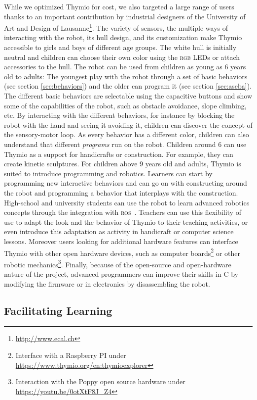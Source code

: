 \documentclass[letterpaper, 10 pt, conference]{ieeeconf}  %
\begin{document}
While we optimized Thymio for cost, we also targeted a large range of users thanks to an important contribution by industrial designers of the University of Art and Design of Lausanne\footnote{\url{http://www.ecal.ch}}.
The variety of sensors, the multiple ways of interacting with the robot, its hull design, and its customization make Thymio accessible to girls and boys of different age groups.
The white hull is initially neutral and children can choose their own color using the \textsc{rgb} LEDs or attach accessories to the hull.
The robot can be used from children as young as 6 years old to adults:
The youngest play with the robot through a set of basic behaviors (see section \ref{sec:behaviors}) and the older can program it (see section \ref{sec:aseba}).
The different basic behaviors are selectable using the capacitive buttons and show some of the capabilities of the robot, such as obstacle avoidance, slope climbing, etc.
By interacting with the different behaviors, for instance by blocking the robot with the hand and seeing it avoiding it, children can discover the concept of the sensory-motor loop. 
As every behavior has a different color, children can also understand that different \emph{programs} run on the robot.
Children around 6 can use Thymio as a support for handicrafts or construction.
For example, they can create kinetic sculptures.
For children above 9 years old and adults, Thymio is suited to introduce programming and robotics.
Learners can start by programming new interactive behaviors and can go on with constructing around the robot and programming a behavior that interplays with the construction.
High-school and university students can use the robot to learn advanced robotics concepts through the integration with \textsc{ros}~\cite{quigley2009ros}.
Teachers can use this flexibility of use to adapt the look and the behavior of Thymio to their teaching activities, or even introduce this adaptation as activity in handicraft or computer science lessons.
Moreover users looking for additional hardware features can interface Thymio with other open hardware devices, such as computer boards\footnote{Interface with a Raspberry PI under \url{https://www.thymio.org/en:thymioexplorer}} or other robotic mechanics\footnote{Interaction with the Poppy open source hardware under \url{https://youtu.be/0otXtF8J_Z4}}.
Finally, because of the open-source and open-hardware nature of the project, advanced programmers can improve their skills in C by modifying the firmware or in electronics by disassembling the robot.

\subsection{Facilitating Learning}
\end{document}
